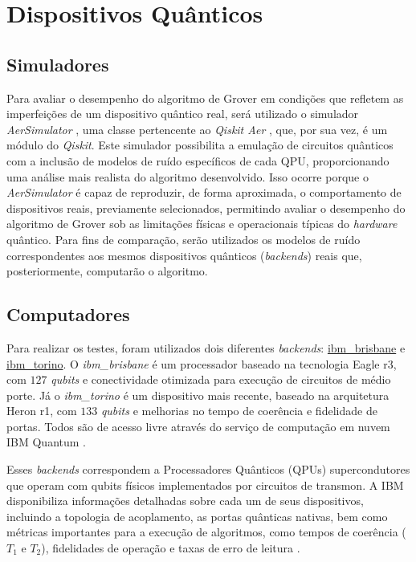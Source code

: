 \section{Dispositivos Qu\^{a}nticos}
\label{sec: dispositivosQuanticos}

\subsection{Simuladores}
\label{subSec: simuladores}

Para avaliar o desempenho do algoritmo de Grover em condições que refletem as imperfeições de um dispositivo qu\^{a}ntico real, ser\'{a} utilizado o simulador \emph{AerSimulator} \cite{qiskit_aersimulator}, uma classe pertencente ao \emph{Qiskit Aer} \cite{qiskit_aer}, que, por sua vez, \'{e} um módulo do \emph{Qiskit}. Este simulador possibilita a emulaç\~{a}o de circuitos qu\^{a}nticos com a inclus\~{a}o de modelos de ruído específicos de cada QPU, proporcionando uma an\'{a}lise mais realista do algoritmo desenvolvido. Isso ocorre porque o \emph{AerSimulator} \'{e} capaz de reproduzir, de forma aproximada, o comportamento de dispositivos reais, previamente selecionados, permitindo avaliar o desempenho do algoritmo de Grover sob as limitações físicas e operacionais típicas do \textit{hardware} qu\^{a}ntico. Para fins de comparaç\~{a}o, ser\~{a}o utilizados os modelos de ruído correspondentes aos mesmos dispositivos qu\^{a}nticos (\textit{backends}) reais que, posteriormente, computar\~{a}o o algoritmo.

\subsection{Computadores}
\label{subSec: computadores}

Para realizar os testes, foram utilizados dois diferentes \textit{backends}: \href{https://quantum.cloud.ibm.com/computers?system=ibm_brisbane}{ibm\_brisbane} e \href{https://quantum.cloud.ibm.com/computers?system=ibm_torino}{ibm\_torino}. O \textit{ibm\_brisbane} é um processador baseado na tecnologia Eagle r3, com $127$ \textit{qubits} e conectividade otimizada para execução de circuitos de médio porte. Já o \textit{ibm\_torino} é um dispositivo mais recente, baseado na arquitetura Heron r1, com $133$ \textit{qubits} e melhorias no tempo de coerência e fidelidade de portas. Todos s\~{a}o de acesso livre atrav\'{e}s do serviço de computaç\~{a}o em nuvem IBM Quantum \cite{IBM_resources}.

Esses \textit{backends} correspondem a Processadores Qu\^{a}nticos (QPUs) supercondutores que operam com qubits físicos implementados por circuitos de transmon. A IBM disponibiliza informações detalhadas sobre cada um de seus dispositivos, incluindo a topologia de acoplamento, as portas qu\^{a}nticas nativas, bem como m\'{e}tricas importantes para a execuç\~{a}o de algoritmos, como tempos de coer\^{e}ncia ($T_1$  e $T_2$), fidelidades de operaç\~{a}o e taxas de erro de leitura \cite{IBM_backends}.

